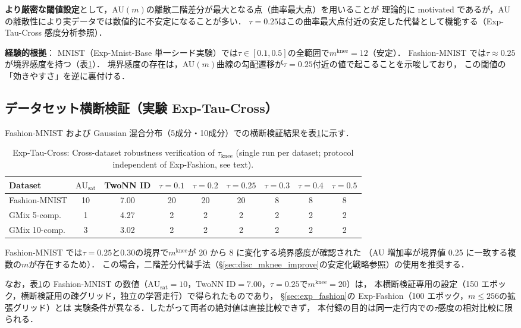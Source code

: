 \documentclass[11pt,a4paper]{jsarticle}
\newcommand{\AUsat}{\mathrm{AU}_{\mathrm{sat}}}
\newcommand{\mknee}{m^{\mathrm{knee}}}
\begin{document}
\textbf{より厳密な閾値設定}として，AU$(m)$の離散二階差分が最大となる点（曲率最大点）を用いることが
理論的に motivated であるが，AU の離散性により実データでは数値的に不安定になることが多い．
$\tau = 0.25$はこの曲率最大点付近の安定した代替として機能する（Exp-Tau-Cross 感度分析参照）．

\textbf{経験的根拠}：
MNIST（Exp-Mnist-Base 単一シード実験）では$\tau \in [0.1, 0.5]$の全範囲で$\mknee = 12$（安定）．
Fashion-MNIST では$\tau \approx 0.25$が境界感度を持つ（表\ref{tab:ez}）．
境界感度の存在は，AU$(m)$曲線の勾配遷移が$\tau = 0.25$付近の値で起こることを示唆しており，
この閾値の「効きやすさ」を逆に裏付ける．

\subsection*{データセット横断検証（実験 Exp-Tau-Cross）}

Fashion-MNIST および Gaussian 混合分布（5成分・10成分）での横断検証結果を表\ref{tab:ez}に示す．

\begin{table}[H]
\centering
\caption{Exp-Tau-Cross: Cross-dataset robustness verification of $\tau_{\mathrm{knee}}$ (single run per dataset; protocol independent of Exp-Fashion, see text).}
\label{tab:ez}
\small
\begin{tabular}{lcc|cccccc}
\toprule
Dataset & $\AUsat$ & TwoNN ID & $\tau=0.1$ & $\tau=0.2$ & $\tau=0.25$ & $\tau=0.3$ & $\tau=0.4$ & $\tau=0.5$ \\
\midrule
Fashion-MNIST & 10 & 7.00 & 20 & 20 & 20 & 8 & 8 & 8 \\
GMix 5-comp. & 1 & 4.27 & 2 & 2 & 2 & 2 & 2 & 2 \\
GMix 10-comp. & 3 & 3.02 & 2 & 2 & 2 & 2 & 2 & 2 \\
\bottomrule
\end{tabular}
\end{table}

Fashion-MNIST では$\tau = 0.25$と$0.30$の境界で$\mknee$が 20 から 8 に変化する境界感度が確認された
（AU 増加率が境界値 0.25 に一致する複数の$m$が存在するため）．
この場合，二階差分代替手法（§\ref{sec:disc_mknee_improve}の安定化戦略参照）の使用を推奨する．

なお，表\ref{tab:ez}の Fashion-MNIST の数値（$\AUsat = 10$，TwoNN ID$=7.00$，$\tau=0.25$で$\mknee = 20$）は，
本横断検証専用の設定（150 エポック，横断検証用の疎グリッド，独立の学習走行）で得られたものであり，
§\ref{sec:exp_fashion}の Exp-Fashion（100 エポック，$m \leq 256$の拡張グリッド）とは
実験条件が異なる．したがって両者の絶対値は直接比較できず，
本付録の目的は同一走行内での$\tau$感度の相対比較に限られる．
\end{document}
